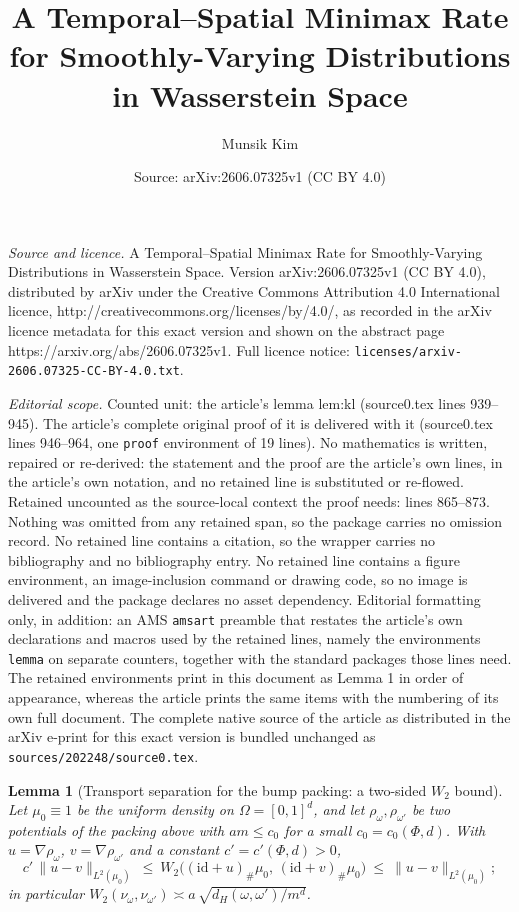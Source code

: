\documentclass[10pt,a4paper]{amsart}
\title{\vspace{-2em}A Temporal--Spatial Minimax Rate for Smoothly-Varying Distributions in Wasserstein Space}
\author{Munsik Kim}
\date{Source: arXiv:2606.07325v1 (CC BY 4.0)}
\newtheorem{lemma}{Lemma}
\begin{document}
\maketitle

\noindent\emph{Source and licence.} \vspace{-2em}A Temporal--Spatial Minimax Rate for Smoothly-Varying Distributions in Wasserstein Space. Version arXiv:2606.07325v1 (CC BY 4.0), distributed by arXiv under the Creative Commons Attribution 4.0 International licence, http://creativecommons.org/licenses/by/4.0/, as recorded in the arXiv licence metadata for this exact version and shown on the abstract page https://arxiv.org/abs/2606.07325v1. Full licence notice: \texttt{licenses/arxiv-2606.07325-CC-BY-4.0.txt}.\par\smallskip

\noindent\textit{Editorial scope.} Counted unit: the article's lemma lem:kl (source0.tex lines 939--945). The article's complete original proof of it is delivered with it (source0.tex lines 946--964, one \texttt{proof} environment of 19 lines). No mathematics is written, repaired or re-derived: the statement and the proof are the article's own lines, in the article's own notation, and no retained line is substituted or re-flowed.  Retained uncounted as the source-local context the proof needs: lines 865--873.  Nothing was omitted from any retained span, so the package carries no omission record.  No retained line contains a citation, so the wrapper carries no bibliography and no bibliography entry.  No retained line contains a figure environment, an image-inclusion command or drawing code, so no image is delivered and the package declares no asset dependency.  Editorial formatting only, in addition: an AMS \texttt{amsart} preamble that restates the article's own declarations and macros used by the retained lines, namely the environments \texttt{lemma} on separate counters, together with the standard packages those lines need.  The retained environments print in this document as Lemma 1 in order of appearance, whereas the article prints the same items with the numbering of its own full document.  The complete native source of the article as distributed in the arXiv e-print for this exact version is bundled unchanged as \texttt{sources/202248/source0.tex}.
\begin{lemma}[Transport separation for the bump packing: a two-sided $W_2$ bound]\label{lem:sep}
Let $\mu_0\equiv1$ be the uniform density on $\Omega=[0,1]^d$, and let $\rho_\omega,\rho_{\omega'}$ be
two potentials of the packing above with $am\le c_0$ for a small $c_0=c_0(\Phi,d)$. With
$u=\nabla\rho_\omega$, $v=\nabla\rho_{\omega'}$ and a constant $c'=c'(\Phi,d)>0$,
\[
  c'\,\|u-v\|_{L^2(\mu_0)}\ \le\ W_2\big((\mathrm{id}+u)_\#\mu_0,\,(\mathrm{id}+v)_\#\mu_0\big)\ \le\ \|u-v\|_{L^2(\mu_0)};
\]
in particular $W_2(\nu_\omega,\nu_{\omega'})\asymp a\,\sqrt{d_H(\omega,\omega')/m^d}$.
\end{lemma}
\end{document}
